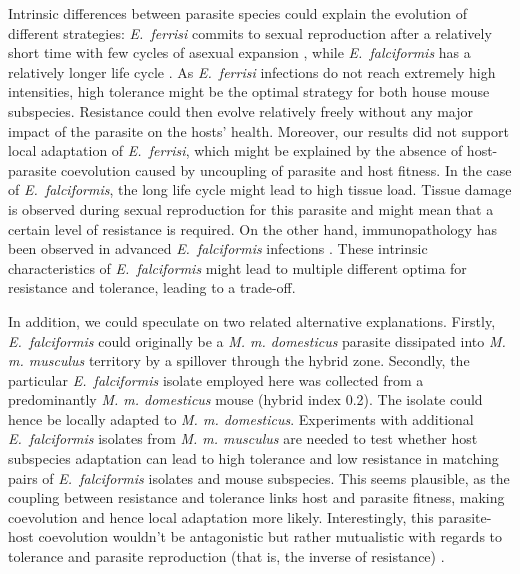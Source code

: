 Intrinsic differences between parasite species could explain the evolution of different strategies: \textit{E.~ferrisi} commits to sexual reproduction after a relatively short time with few cycles of asexual expansion \citep{al-khlifeh_eimeria_2019, ankrom_life_1975}, while \textit{E.~falciformis }has a relatively longer life cycle \citep{al-khlifeh_eimeria_2019, haberkorn_entwicklung_1970}. As \textit{E.~ferrisi }infections do not reach extremely high intensities, high tolerance might be the optimal strategy for both house mouse subspecies. Resistance could then evolve relatively freely without any major impact of the parasite on the hosts’ health. Moreover, our results did not support local adaptation of \textit{E.~ferrisi}, which might be explained by the absence of host-parasite coevolution caused by uncoupling of parasite and host fitness. In the case of \textit{E.~falciformis}, the long life cycle might lead to high tissue load. Tissue damage is observed during sexual reproduction for this parasite \citep{ehret_dual_2017} and might mean that a certain level of resistance is required. On the other hand, immunopathology has been observed in advanced \textit{E.~falciformis} infections \citep{stange_il-22_2012}. These intrinsic characteristics of \textit{E.~falciformis} might lead to multiple different optima for resistance and tolerance, leading to a trade-off.\par

In addition, we could speculate on two related alternative explanations. Firstly, \textit{E.~falciformis} could originally be a \textit{M. m. domesticus} parasite dissipated into \textit{M. m. musculus} territory by a spillover through the hybrid zone. Secondly, the particular \textit{E.~falciformis} isolate employed here was collected from a predominantly \textit{M. m. domesticus} mouse (hybrid index 0.2). The isolate could hence be locally adapted to \textit{M. m. domesticus}. Experiments with additional \textit{E.~falciformis} isolates from \textit{M. m. musculus} are needed to test whether host subspecies adaptation can lead to high tolerance and low resistance in matching pairs of \textit{E.~falciformis} isolates and mouse subspecies. This seems plausible, as the coupling between resistance and tolerance links host and parasite fitness, making coevolution and hence local adaptation more likely. Interestingly, this parasite-host coevolution wouldn’t be antagonistic but rather mutualistic with regards to tolerance and parasite reproduction (that is, the inverse of resistance) \citep{little_coevolution_2010, raaberg_decomposing_2009}. \par

